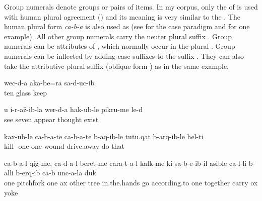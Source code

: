 Group numerals denote groups or pairs of items. In my corpus, only the  of   is used with human plural agreement () and its meaning is very similar to the  . The human plural form \textit{ca-b-a} is also used as  (see  for the case paradigm and   for one example). All other group numerals carry the neuter plural suffix  . Group numerals can be attributes of , which normally occur in the plural . Group numerals can be inflected by adding case suffixes to the suffix  . They can also take the attributive plural suffix  (oblique form ) as in the same example.

\ea\label{ex:thedoctortriedtenpairsofglasses}
\gll	wec{\ej}-d-a	{\eppl}a{\pha}{\paaf}k{\lmk}a-be=ra	sa-d-uc-ib\\
	ten	glass	keep\\
\glt	{}

\ex\label{ex:afterIsawyoumanythoughtsarose}
\gll	u	{\paaf}i-r-až-ib-la\parn{,}	wer-d-a	hak{\ej}-ub-le	pikru-me	le-d\\
		see	seven	appear	thought	exist\\
\glt	{}

\ex\label{ex:killingsomewoundingothers}
\gll	kax-ub-le	ca-b-a-te	ca-b-a-te	b-a{\pha}q-ib-le	t{\ej}ut{\ej}u.q{\ej}a{\pha}t{\ej}	b-arq{\ej}-ib-le	hel-t{\lmk}i\\
	kill-	one		one 	wound		drive.away	do	that\\
\glt	{}

\ex\label{ex:somepeopletookpitchforks}
\gll	ca-b-a-l	q{\ej}ig-me,	ca-d-a-l	beret-me	cara-t-a-l	k{\lmk}alk-me	k{\lab}i	sa-b-e{\vuvfr}-ib-il	{\phfr}a{\pha}sible	ca-l-li	b-alli	b-erq{\lmk}-ib	ca-b	unc-a-la	duk{\ej}\\
	one	pitchfork	one	ax	other	tree	in.the.hands	go	according.to	one	\tsc{n-}together	carry		ox	yoke\\
\glt	{}
\z



